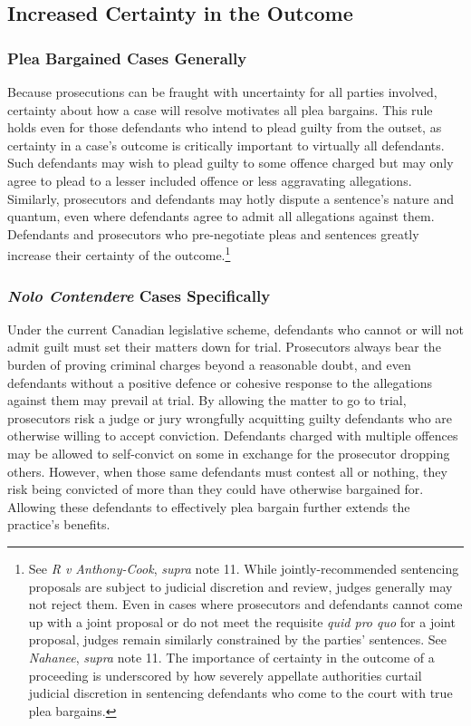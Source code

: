 \subsection{Increased Certainty in the Outcome}

\subsubsection{Plea Bargained Cases Generally}

Because prosecutions can be fraught with uncertainty for all parties involved, certainty about how a case will resolve motivates all plea bargains. This rule holds even for those defendants who intend to plead guilty from the outset, as certainty in a case's outcome is critically important to virtually all defendants. Such defendants may wish to plead guilty to some offence charged but may only agree to plead to a lesser included offence or less aggravating allegations. Similarly, prosecutors and defendants may hotly dispute a sentence's nature and quantum, even where defendants agree to admit all allegations against them. Defendants and prosecutors who pre-negotiate pleas and sentences greatly increase their certainty of the outcome.\footnote{See \textit{R v Anthony-Cook}, \textit{supra} note 11. While jointly-recommended sentencing proposals are subject to judicial discretion and review, judges generally may not reject them. Even in cases where prosecutors and defendants cannot come up with a joint proposal or do not meet the requisite \textit{quid pro quo} for a joint proposal, judges remain similarly constrained by the parties' sentences. See \textit{Nahanee}, \textit{supra} note 11. The importance of certainty in the outcome of a proceeding is underscored by how severely appellate authorities curtail judicial discretion in sentencing defendants who come to the court with true plea bargains.}

\subsubsection{\textit{Nolo Contendere} Cases Specifically}

Under the current Canadian legislative scheme, defendants who cannot or will not admit guilt must set their matters down for trial. Prosecutors always bear the burden of proving criminal charges beyond a reasonable doubt, and even defendants without a positive defence or cohesive response to the allegations against them may prevail at trial. By allowing the matter to go to trial, prosecutors risk a judge or jury wrongfully acquitting guilty defendants who are otherwise willing to accept conviction. Defendants charged with multiple offences may be allowed to self-convict on some in exchange for the prosecutor dropping others. However, when those same defendants must contest all or nothing, they risk being convicted of more than they could have otherwise bargained for. Allowing these defendants to effectively plea bargain further extends the practice's benefits.

